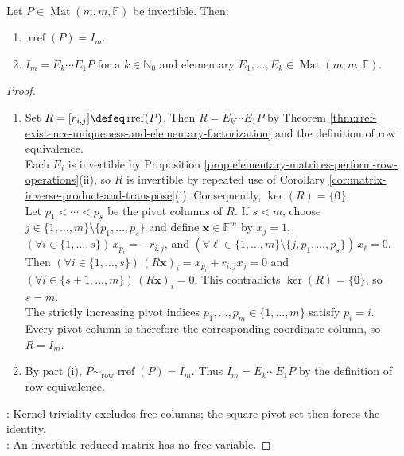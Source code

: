 \begin{lemma} \label{lem:invertible-matrices-row-reduce-to-identity} \\
Let $P\in\operatorname{Mat}(m,m,\mathbb{F})$ be invertible. Then:
\begin{enumerate}[label=(\roman*)]
\setlength{\itemsep}{0pt}
\item $\operatorname{rref}(P)=I_m$.
\item $I_m=E_k\cdots E_1P$ for a $k\in\mathbb{N}_0$ and elementary $E_1,\ldots,E_k\in\operatorname{Mat}(m,m,\mathbb{F})$.
\end{enumerate}
\begin{proof}
\begin{enumerate}[label=(\roman*)]
\setlength{\itemsep}{0pt}
\item Set $R=[r_{i,j}]\defeq\operatorname{rref}(P)$. Then $R=E_k\cdots E_1P$ by Theorem \ref{thm:rref-existence-uniqueness-and-elementary-factorization} and the definition of row equivalence.\\
Each $E_i$ is invertible by Proposition \ref{prop:elementary-matrices-perform-row-operations}(ii), so $R$ is invertible by repeated use of Corollary \ref{cor:matrix-inverse-product-and-transpose}(i). Consequently, $\ker(R)=\{\mathbf{0}\}$.\\
Let $p_1<\cdots<p_s$ be the pivot columns of $R$. If $s<m$, choose $j\in\{1,\ldots,m\}\setminus\{p_1,\ldots,p_s\}$ and define $\mathbf{x}\in\mathbb{F}^m$ by $x_j=1$, $(\forall i\in\{1,\ldots,s\})\,x_{p_i}=-r_{i,j}$, and $(\forall \ell\in\{1,\ldots,m\}\setminus\{j,p_1,\ldots,p_s\})\,x_{\ell}=0$.\\
Then $(\forall i\in\{1,\ldots,s\})\,(R\mathbf{x})_i=x_{p_i}+r_{i,j}x_j=0$ and $(\forall i\in\{s+1,\ldots,m\})\,(R\mathbf{x})_i=0$. This contradicts $\ker(R)=\{\mathbf{0}\}$, so $s=m$.\\
The strictly increasing pivot indices $p_1,\ldots,p_m\in\{1,\ldots,m\}$ satisfy $p_i=i$.\\
Every pivot column is therefore the corresponding coordinate column, so $R=I_m$.
\item By part (i), $P\sim_{\mathrm{row}}\operatorname{rref}(P)=I_m$. Thus $I_m=E_k\cdots E_1P$ by the definition of row equivalence.
\end{enumerate}
: Kernel triviality excludes free columns; the square pivot set then forces the identity.\\
: An invertible reduced matrix has no free variable.
\end{proof}
\end{lemma}

